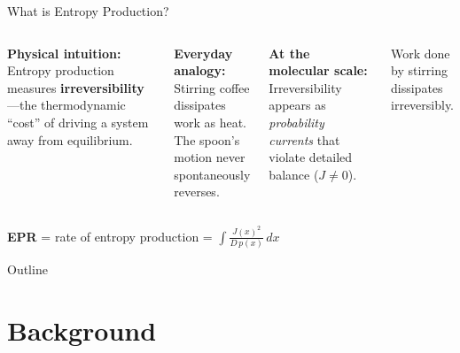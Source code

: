 \documentclass[aspectratio=169,11pt]{beamer}
\newcommand{\emphbox}[1]{\colorbox{blue!8}{\parbox{0.92\textwidth}{#1}}}
\begin{document}
\begin{frame}{What is Entropy Production?}

\begin{columns}[T]
\textbf{Physical intuition:}\\[0.3em]
Entropy production measures \textbf{irreversibility}---the thermodynamic ``cost'' of driving a system away from equilibrium.

\smallskip
\textbf{Everyday analogy:}\\
Stirring coffee dissipates work as heat.\\
The spoon's motion never spontaneously reverses.

\smallskip
\textbf{At the molecular scale:}\\
Irreversibility appears as \emph{probability currents} that violate detailed balance ($J \neq 0$).

\centering
{}

\vspace{0.3em}
{\small Work done by stirring\\dissipates irreversibly.}
\end{columns}

\vspace{0.5em}
\emphbox{
\centering
\textbf{EPR} = rate of entropy production = $\displaystyle\int \frac{J(x)^2}{D\,p(x)}\,dx$
}

\end{frame}

\begin{frame}{Outline}
\tableofcontents
\end{frame}

\section{Background}
\end{document}
